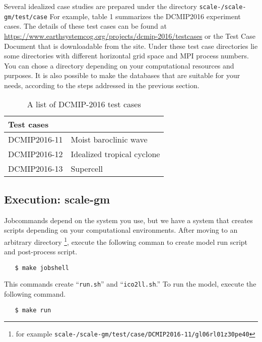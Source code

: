 Several idealized case studies are prepared under the directory
\noindent \texttt{scale-{\version}/scale-gm/test/case}
For example, table 1 summarizes the DCMIP2016 experiment cases.
The details of these test cases can be found at
\url{https://www.earthsystemcog.org/projects/dcmip-2016/testcases}
or the Test Case Document that is downloadable from the site.
Under these test case directories lie some directories with
different horizontal grid space and MPI process numbers.
You can chose a directory depending on your computational resources
and purposes.
It is also possible to make the databases that are suitable for your needs,
according to the steps addressed in the previous section.
 \begin{table}[h]
 \begin{center}
 \caption{A list of DCMIP-2016 test cases}
 \begin{tabularx}{150mm}{|l|X|} \hline
 \rowcolor[gray]{0.9} Test cases \\ \hline
  DCMIP2016-11 & Moist baroclinic wave  \\ \hline
  DCMIP2016-12 & Idealized tropical cyclone \\ \hline
  DCMIP2016-13 & Supercell \\ \hline
 \end{tabularx}
 \end{center}
 \end{table}


\subsection{Execution: scale-gm}

Jobcommands depend on the system you use, but we have a system
that creates scripts depending on your computational environments.
After moving to an arbitrary directory \footnote{for example
  \texttt{scale-{\version}/scale-gm/test/case/DCMIP2016-11/gl06rl01z30pe40}},
execute the following comman to create model run script and post-process script.

 \begin{verbatim}
   $ make jobshell
 \end{verbatim}

This commands create ``\verb|run.sh|'' and ``\verb|ico2ll.sh|.''
To run the model, execute the following command.

 \begin{verbatim}
   $ make run
 \end{verbatim}

